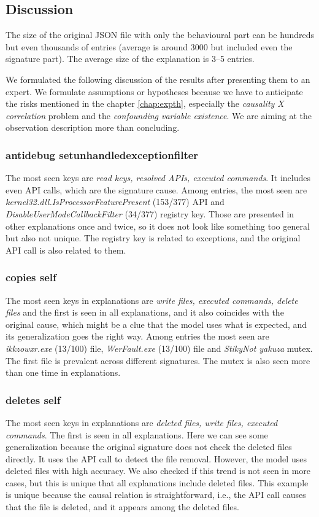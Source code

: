 \subsection{Discussion}
The size of the original JSON file with only the behavioural part can be hundreds but even thousands of entries (average is around $3000$ but included even the signature part). The average size of the explanation is 3--5 entries.

We formulated the following discussion of the results after presenting them to an expert. We formulate assumptions or hypotheses because we have to anticipate the risks mentioned in the chapter \ref{chap:expth}, especially the \emph{causality X correlation} problem and the \emph{confounding variable existence}. We are aiming at the observation description more than concluding.

\subsubsection*{antidebug setunhandledexceptionfilter}
The most seen keys are \emph{read keys, resolved APIs, executed commands}. It includes even API calls, which are the signature cause. Among entries, the most seen are \emph{kernel32.dll.IsProcessorFeaturePresent} (153/377) API and \emph{DisableUserModeCallbackFilter} (34/377) registry key. Those are presented in other explanations once and twice, so it does not look like something too general but also not unique. The registry key is related to exceptions, and the original API call is also related to them.

\subsubsection*{copies self}
The most seen keys in explanations are \emph{write files, executed commands, delete files} and the first is seen in all explanations, and it also coincides with the original cause, which might be a clue that the model uses what is expected, and its generalization goes the right way. Among entries the most seen are \emph{ikkzowxr.exe} (13/100) file, \emph{WerFault.exe} (13/100) file and \emph{StikyNot yakuza} mutex. The first file is prevalent across different signatures. The mutex is also seen more than one time in explanations.

\subsubsection*{deletes self}
The most seen keys in explanations are \emph{deleted files, write files, executed commands}. The first is seen in all explanations. Here we can see some generalization because the original signature does not check the deleted files directly. It uses the API call to detect the file removal. However, the model uses deleted files with high accuracy. We also checked if this trend is not seen in more cases, but this is unique that all explanations include deleted files. This example is unique because the causal relation is straightforward, i.e., the API call causes that the file is deleted, and it appears among the deleted files. 

